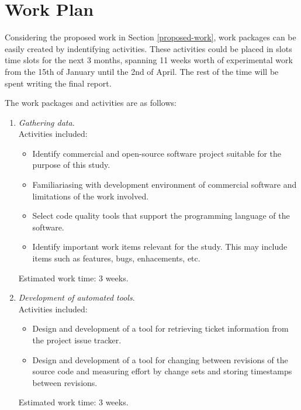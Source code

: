 \documentclass{mprop}
\begin{document}
% 

\section{Work Plan}
\label{work-plan}

Considering the proposed work in Section \ref{proposed-work}, work packages can
be easily created by indentifying activities. These activities could be placed
in slots time slots for the next 3 months, spanning 11 weeks worth of
experimental work from the 15th of January until the 2nd of April. The rest of
the time will be spent writing the final report.

The work packages and activities are as follows:

\begin{enumerate}
	\item \textit{Gathering data}.\\
	Activities included:
	\begin{itemize}
		\item Identify commercial and open-source software project suitable for
		the purpose of this study.
		\item Familiariasing with development environment of commercial software
		and limitations of the work involved.
		\item Select code quality tools that support the programming language of
		the software.
		\item Identify important work items relevant for the study. This may
		include items such as features, bugs, enhacements, etc.
	\end{itemize}

	Estimated work time: 3 weeks.\\
	
	\item \textit{Development of automated tools}.\\
	Activities included:
	\begin{itemize}
		\item Design and development of a tool for retrieving ticket information
		from the project issue tracker.
		\item Design and development of a tool for changing between revisions of
		the source code and measuring effort by change sets and storing
		timestamps between revisions.
	\end{itemize}

	Estimated work time: 3 weeks.\\


\end{enumerate}
\end{document}
